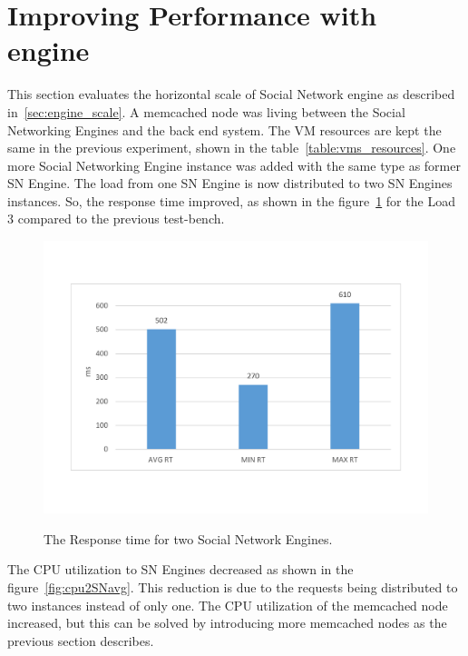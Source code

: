 \section{Improving Performance with engine}
This section evaluates the horizontal scale of Social Network engine as described in~\ref{sec:engine_scale}. A memcached node was living between the Social Networking Engines and the back end system. The VM resources are kept the same in the previous experiment, shown in the table~\ref{table:vms_resources}. One more Social Networking Engine instance was added with the same type as former SN Engine. The load from one SN Engine is now distributed to two SN Engines instances. So, the response time improved, as shown in the figure~\ref{fig:rt2SN} for the Load 3 compared to the previous test-bench. 

\begin{figure}[h]
	\caption{The Response time for two Social Network Engines.}
	\includegraphics[width=1\textwidth,natwidth=200,natheight=150]{./fig/RT2SN.pdf}
	\centering
	\label{fig:rt2SN}
\end{figure}

The CPU utilization to SN Engines decreased as shown in the figure~\ref{fig:cpu2SNavg}. This reduction is due to the requests being distributed to two instances instead of only one. The CPU utilization of the memcached node increased, but this can be solved by introducing more memcached nodes as the previous section describes. 

